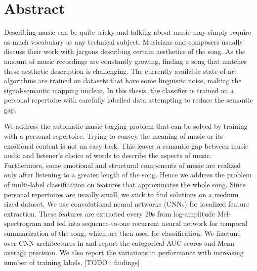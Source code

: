 \documentclass{book}
\begin{document}
\aicescoverpage


\section*{Abstract}

Describing music can be quite tricky and talking about music may simply require as much vocabulary as any technical subject. Musicians and composers usually discuss their work with jargons describing certain aesthetics of the song. As the amount of music recordings are constantly growing, finding a song that matches these aesthetic description is challenging. The currently available state-of-art algorithms are trained on datasets that have some linguistic noise, making the signal-semantic mapping unclear. In this thesis, the classifier is trained on a personal repertoire with carefully labelled data attempting to reduce the semantic gap.          

We address the automatic music tagging problem that can be solved by training with a personal repertoire. Trying to convey the meaning of music or its emotional content is not an easy task. This leaves a  semantic gap between music audio and listener's choice of words to describe the aspects of music. Furthermore, some emotional and structural components of music are realized only after listening to a greater length of the song. Hence we address the problem of multi-label classification on features that approximates the whole song. Since personal repertoires are usually small, we stick to find solutions on a medium sized dataset. We use convolutional neural networks (CNNs) for localized feature extraction. These features are extracted every 29s from log-amplitude Mel-spectrogram and fed into sequence-to-one recurrent neural network for temporal summarization of the song, which are then used for classification. We finetune over CNN architectures in \cite{choi_cnn} \cite{choi_crnn} and report the categorical AUC scores and Mean average precision. We also report the variations in performance with increasing number of training labels. [TODO : findings]
\vspace{5cm}
\end{document}
